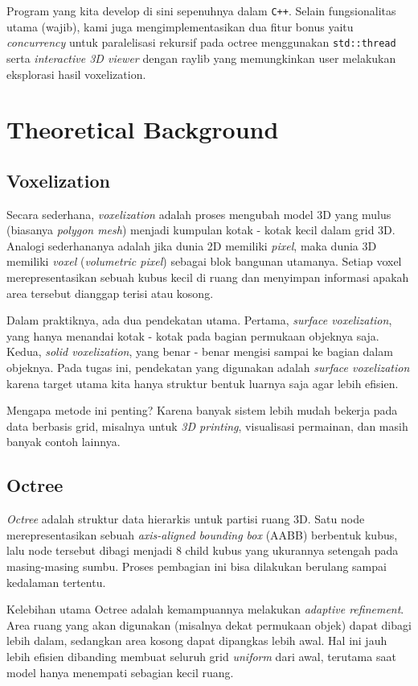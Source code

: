 \documentclass[11pt,a4paper]{article}
\begin{document}
Program yang kita develop di sini sepenuhnya dalam \texttt{C++}. Selain fungsionalitas utama (wajib),
kami juga mengimplementasikan dua fitur bonus yaitu \textit{concurrency} untuk paralelisasi
rekursif pada octree menggunakan \texttt{std::thread} serta \textit{interactive 3D viewer}
dengan raylib yang memungkinkan user melakukan eksplorasi hasil voxelization.

\section{Theoretical Background}\label{sec:teori}
\subsection{Voxelization}
Secara sederhana, \textit{voxelization} adalah proses mengubah model 3D yang mulus
(biasanya \textit{polygon mesh}) menjadi kumpulan kotak - kotak kecil dalam grid 3D.
Analogi sederhananya adalah jika dunia 2D memiliki \textit{pixel}, maka dunia 3D memiliki
\textit{voxel} (\textit{volumetric pixel}) sebagai blok bangunan utamanya. Setiap voxel merepresentasikan sebuah kubus kecil
di ruang dan menyimpan informasi apakah area tersebut dianggap terisi atau kosong.

Dalam praktiknya, ada dua pendekatan utama. Pertama, \textit{surface voxelization}, yang hanya
menandai kotak - kotak pada bagian permukaan objeknya saja. Kedua, \textit{solid voxelization},
yang benar - benar mengisi sampai ke bagian dalam objeknya. Pada tugas ini, pendekatan yang digunakan
adalah \textit{surface voxelization} karena target utama kita hanya struktur bentuk luarnya saja agar lebih efisien.

Mengapa metode ini penting? Karena banyak sistem lebih mudah bekerja pada data berbasis grid,
misalnya untuk \textit{3D printing}, visualisasi permainan, dan masih banyak contoh lainnya.
\subsection{Octree}
\textit{Octree} adalah struktur data hierarkis untuk partisi ruang 3D. Satu node merepresentasikan
sebuah \textit{axis-aligned bounding box} (AABB) berbentuk kubus, lalu node tersebut dibagi menjadi
8 child kubus yang ukurannya setengah pada masing-masing sumbu. Proses pembagian ini bisa dilakukan
berulang sampai kedalaman tertentu.

Kelebihan utama Octree adalah kemampuannya melakukan \textit{adaptive refinement}. Area ruang yang
akan digunakan (misalnya dekat permukaan objek) dapat dibagi lebih dalam, sedangkan area kosong dapat
dipangkas lebih awal. Hal ini jauh lebih efisien dibanding membuat seluruh grid \textit{uniform} dari awal,
terutama saat model hanya menempati sebagian kecil ruang.
\end{document}
